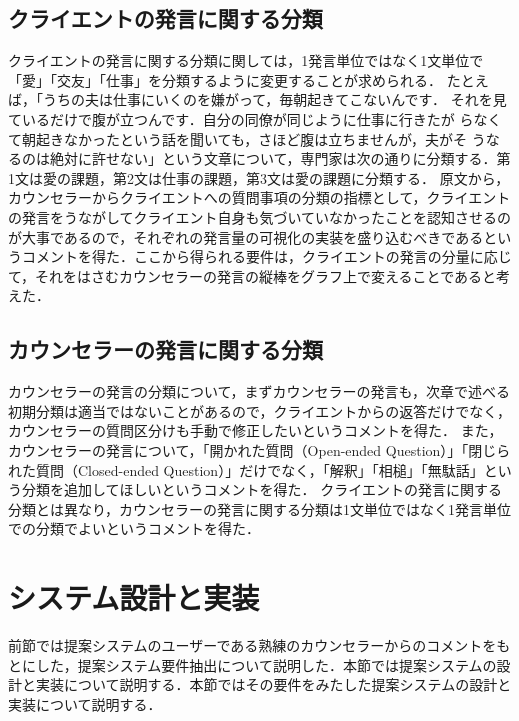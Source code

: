 \documentclass[shuuron]{kuee}
\begin{document}
\subsection{クライエントの発言に関する分類}



クライエントの発言に関する分類に関しては，1発言単位ではなく1文単位で「愛」「交友」「仕事」を分類するように変更することが求められる．
たとえば，「うちの夫は仕事にいくのを嫌がって，毎朝起きてこないんです．
それを見ているだけで腹が立つんです．自分の同僚が同じように仕事に行きたが
らなくて朝起きなかったという話を聞いても，さほど腹は立ちませんが，夫がそ
うなるのは絶対に許せない」という文章について，専門家は次の通りに分類する．第1文は愛の課題，第2文は仕事の課題，第3文は愛の課題に分類する．
原文から，カウンセラーからクライエントへの質問事項の分類の指標として，クライエントの発言をうながしてクライエント自身も気づいていなかったことを認知させるのが大事であるので，それぞれの発言量の可視化の実装を盛り込むべきであるというコメントを得た．ここから得られる要件は，クライエントの発言の分量に応じて，それをはさむカウンセラーの発言の縦棒をグラフ上で変えることであると考えた．

\subsection{カウンセラーの発言に関する分類}

カウンセラーの発言の分類について，まずカウンセラーの発言も，次章で述べる初期分類は適当ではないことがあるので，クライエントからの返答だけでなく，カウンセラーの質問区分けも手動で修正したいというコメントを得た．
また，カウンセラーの発言について，「開かれた質問（Open-ended Question）」「閉じられた質問（Closed-ended Question）」だけでなく，「解釈」「相槌」「無駄話」という分類を追加してほしいというコメントを得た．
クライエントの発言に関する分類とは異なり，カウンセラーの発言に関する分類は1文単位ではなく1発言単位での分類でよいというコメントを得た．







\section{システム設計と実装}

前節では提案システムのユーザーである熟練のカウンセラーからのコメントをもとにした，提案システム要件抽出について説明した．本節では提案システムの設計と実装について説明する．本節ではその要件をみたした提案システムの設計と実装について説明する．
\end{document}
